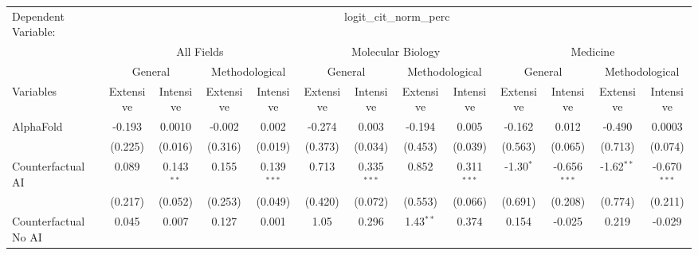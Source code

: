 \begingroup
\centering
\begin{tabular}{lcccccccccccc}
   \tabularnewline \midrule \midrule
   Dependent Variable: & \multicolumn{12}{c}{logit\_cit\_norm\_perc}\\
 & \multicolumn{4}{c}{All Fields} & \multicolumn{4}{c}{Molecular Biology} & \multicolumn{4}{c}{Medicine} \\
\cmidrule(lr){2-5} \cmidrule(lr){6-9} \cmidrule(lr){10-13}
 & \multicolumn{2}{c}{General} & \multicolumn{2}{c}{Methodological} & \multicolumn{2}{c}{General} & \multicolumn{2}{c}{Methodological} & \multicolumn{2}{c}{General} & \multicolumn{2}{c}{Methodological} \\
\cmidrule(lr){2-3} \cmidrule(lr){4-5} \cmidrule(lr){6-7} \cmidrule(lr){8-9} \cmidrule(lr){10-11} \cmidrule(lr){12-13}
Variables & \multicolumn{1}{c}{Extensive} & \multicolumn{1}{c}{Intensive} & \multicolumn{1}{c}{Extensive} & \multicolumn{1}{c}{Intensive} & \multicolumn{1}{c}{Extensive} & \multicolumn{1}{c}{Intensive} & \multicolumn{1}{c}{Extensive} & \multicolumn{1}{c}{Intensive} & \multicolumn{1}{c}{Extensive} & \multicolumn{1}{c}{Intensive} & \multicolumn{1}{c}{Extensive} & \multicolumn{1}{c}{Intensive} \\
\cmidrule(lr){1-1}\cmidrule(lr){2-2} \cmidrule(lr){3-3} \cmidrule(lr){4-4} \cmidrule(lr){5-5} \cmidrule(lr){6-6} \cmidrule(lr){7-7} \cmidrule(lr){8-8} \cmidrule(lr){9-9} \cmidrule(lr){10-10} \cmidrule(lr){11-11} \cmidrule(lr){12-12} \cmidrule(lr){13-13}
   AlphaFold                                & -0.193  & 0.0010       & -0.002  & 0.002         & -0.274  & 0.003         & -0.194      & 0.005         & -0.162      & 0.012          & -0.490       & 0.0003\\   
                                            & (0.225) & (0.016)      & (0.316) & (0.019)       & (0.373) & (0.034)       & (0.453)     & (0.039)       & (0.563)     & (0.065)        & (0.713)      & (0.074)\\   
   Counterfactual AI                        & 0.089   & 0.143$^{**}$ & 0.155   & 0.139$^{***}$ & 0.713   & 0.335$^{***}$ & 0.852       & 0.311$^{***}$ & -1.30$^{*}$ & -0.656$^{***}$ & -1.62$^{**}$ & -0.670$^{***}$\\   
                                            & (0.217) & (0.052)      & (0.253) & (0.049)       & (0.420) & (0.072)       & (0.553)     & (0.066)       & (0.691)     & (0.208)        & (0.774)      & (0.211)\\   
   Counterfactual No AI                     & 0.045   & 0.007        & 0.127   & 0.001         & 1.05    & 0.296         & 1.43$^{**}$ & 0.374         & 0.154       & -0.025         & 0.219        & -0.029\\   

\end{tabular}
